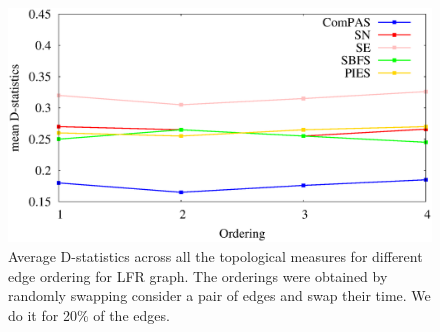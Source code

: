 \begin{figure}
\includegraphics[scale=0.3]{figures/param_edge_order_LFR.eps}
\caption{Average D-statistics across all the topological measures for different edge ordering for LFR graph. The orderings were obtained by randomly swapping consider a pair of edges and swap their time. We do it for 20\% of the edges.}
\end{figure}


